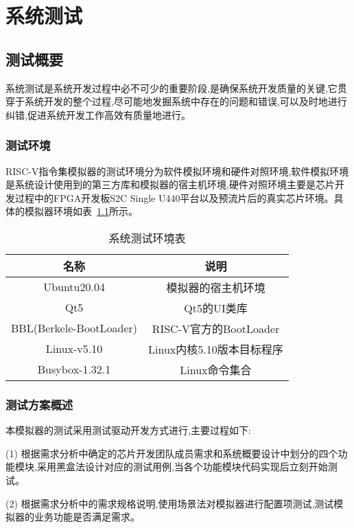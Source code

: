
\chapter{系统测试}

\section{测试概要}
系统测试是系统开发过程中必不可少的重要阶段,是确保系统开发质量的关键,它贯穿于系统开发的整个过程,尽可能地发掘系统中存在的问题和错误,可以及时地进行纠错,促进系统开发工作高效有质量地进行。

\subsection{测试环境}
RISC-V指令集模拟器的测试环境分为软件模拟环境和硬件对照环境,软件模拟环境是系统设计使用到的第三方库和模拟器的宿主机环境,硬件对照环境主要是芯片开发过程中的FPGA开发板S2C Single U440平台以及预流片后的真实芯片环境。具体的模拟器环境如表~\ref{tab:env}所示。
\begin{table}[h]
    \centering
    \caption{系统测试环境表}
    \label{tab:env}
    \begin{tabular}{cc}
      \toprule
      名称	& 说明\\
      \midrule
    Ubuntu20.04	& \multicolumn{1}{c}{模拟器的宿主机环境}\\
    Qt5	& \multicolumn{1}{c}{Qt5的UI类库}\\
    BBL(Berkele-BootLoader)	& \multicolumn{1}{c}{RISC-V官方的BootLoader}\\
    Linux-v5.10    & \multicolumn{1}{c}{Linux内核5.10版本目标程序}\\
    Busybox-1.32.1 & \multicolumn{1}{c}{Linux命令集合}\\
      \bottomrule
    \end{tabular}
\end{table}


\subsection{测试方案概述}
本模拟器的测试采用测试驱动开发方式进行,主要过程如下:


(1) 根据需求分析中确定的芯片开发团队成员需求和系统概要设计中划分的四个功能模块,采用黑盒法设计对应的测试用例,当各个功能模块代码实现后立刻开始测试。


(2) 根据需求分析中的需求规格说明,使用场景法对模拟器进行配置项测试,测试模拟器的业务功能是否满足需求。


